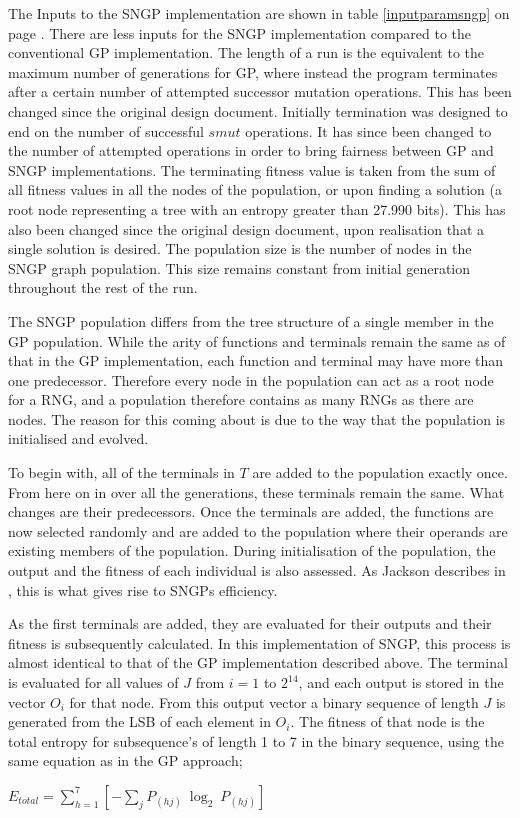 \documentclass[a4paper,10.5pt]{article}
\begin{document}
The Inputs to the SNGP implementation are shown in table \ref{inputparamsngp} on page \pageref{inputparamsngp}. There are less inputs for the SNGP implementation compared to the conventional GP implementation. The length of a run is the equivalent to the maximum number of generations for GP, where instead the program terminates after a certain number of attempted successor mutation operations. This has been changed since the original design document. Initially termination was designed to end on the number of successful $smut$ operations. It has since been changed to the number of attempted operations in order to bring fairness between GP and SNGP implementations. The terminating fitness value is taken from the sum of all fitness values in all the nodes of the population, or upon finding a solution (a root node representing a tree with an entropy greater than 27.990 bits). This has also been changed since the original design document, upon realisation that a single solution is desired. The population size is the number of nodes in the SNGP graph population. This size remains constant from initial generation throughout the rest of the run.

The SNGP population differs from the tree structure of a single member in the GP population. While the arity of functions and terminals remain the same as of that in the GP implementation, each function and terminal may have more than one predecessor. Therefore every node in the population can act as a root node for a RNG, and a population therefore contains as many RNGs as there are nodes. The reason for this coming about is due to the way that the population is initialised and evolved.

To begin with, all of the terminals in $T$ are added to the population exactly once. From here on in over all the generations, these terminals remain the same. What changes are their predecessors. Once the terminals are added, the functions are now selected randomly and are added to the population where their operands are existing members of the population. During initialisation of the population, the output and the fitness of each individual is also assessed. As Jackson describes in \cite[p.52]{jacksonsngp2}, this is what gives rise to SNGPs efficiency.

As the first terminals are added, they are evaluated for their outputs and their fitness is subsequently calculated. In this implementation of SNGP, this process is almost identical to that of the GP implementation described above. The terminal is evaluated for all values of $J$ from $i = 1$ to $2^{14}$, and each output is stored in the vector $O_i$ for that node. From this output vector a binary sequence of length $J$ is generated from the LSB of each element in $O_i$. The fitness of that node is the total entropy for subsequence's of length 1 to 7 in the binary sequence, using the same equation as in the GP approach;
\begin{center}
 $E_{total} = \sum_{h = 1}^{7} \left[ - \sum_{j} P_{(hj)}\ \log_2\ P_{(hj)} \right]$
\end{center} 
\end{document}
